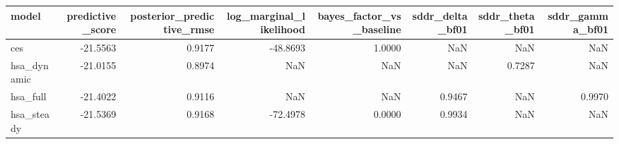 \begin{tabular}{lrrrrrrr}
\toprule
model & predictive\_score & posterior\_predictive\_rmse & log\_marginal\_likelihood & bayes\_factor\_vs\_baseline & sddr\_delta\_bf01 & sddr\_theta\_bf01 & sddr\_gamma\_bf01 \\
\midrule
ces & -21.5563 & 0.9177 & -48.8693 & 1.0000 & NaN & NaN & NaN \\
hsa\_dynamic & -21.0155 & 0.8974 & NaN & NaN & NaN & 0.7287 & NaN \\
hsa\_full & -21.4022 & 0.9116 & NaN & NaN & 0.9467 & NaN & 0.9970 \\
hsa\_steady & -21.5369 & 0.9168 & -72.4978 & 0.0000 & 0.9934 & NaN & NaN \\
\bottomrule
\end{tabular}
